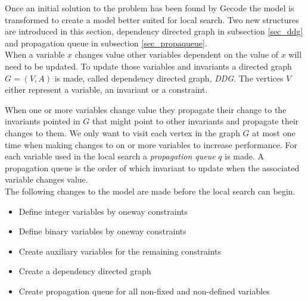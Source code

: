Once an initial solution to the problem has been found by Gecode the model is transformed to create a model better 
suited for local search. Two new structures  are introduced in 
this section, dependency directed graph  in subsection \ref{sec_ddg} and propagation 
queue in subsection \ref{sec_propaqueue}.  \\ 
When a variable $x$ changes value other variables dependent on the value of $x$ will need to be updated. To 
update those variables and invariants a directed graph $G=(V,A)$ is made, called dependency directed graph, \emph{DDG}. 
The vertices $V$ either represent a variable, an invariant or a constraint. 
 
When one or more variables change value they propagate their change to the invariants pointed in $G$ that might point 
to other invariants and propagate their changes to them. We only want to visit each vertex in the graph $G$ at most one 
time when making changes to on or more variables to increase performance. For each variable used in 
the local search a \emph{propagation queue} $q$ is made. A propagation queue is the order of which invariant to update 
when the associated variable changes value.  \medskip \\
The following changes to the model are made before the local search can begin. 
\begin{itemize}
 \item Define integer variables by oneway constraints
 \item Define binary variables by oneway constraints 
 \item Create auxiliary variables for the remaining constraints
 \item Create a dependency directed graph
 \item Create propagation queue for all non-fixed and non-defined variables
\end{itemize}

